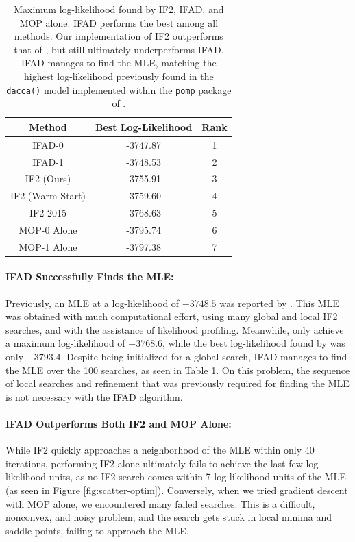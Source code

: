 \documentclass[11pt]{article}
\begin{document}
\begin{table}[h!]
\centering
\begin{tabular}{||c c c||} 
 \hline
 Method & Best Log-Likelihood & Rank \\ [0.5ex] 
 \hline\hline
     IFAD-0 & -3747.87 & 1\\
     IFAD-1 & -3748.53 & 2\\
     IF2 (Ours) & -3755.91 & 3\\
     IF2 (Warm Start) & -3759.60 & 4 \\
     IF2 2015 & -3768.63 & 5\\ 
     MOP-0 Alone & -3795.74 & 6\\
     MOP-1 Alone & -3797.38 & 7\\
 \hline
\end{tabular}
\caption{Maximum log-likelihood found by IF2, IFAD, and MOP alone. IFAD performs the best among all methods. Our implementation of IF2 outperforms that of \cite{ionides15}, but still ultimately underperforms IFAD. IFAD manages to find the MLE, matching the highest log-likelihood previously found in the \texttt{dacca()} model implemented within the \texttt{pomp} package of \cite{king16}.}
\label{table:mle}
\end{table}

\paragraph{IFAD Successfully Finds the MLE:} Previously, an MLE at a log-likelihood of $-3748.5$ was reported by \cite{king16}.
This MLE was obtained with much computational effort, using many global and local IF2 searches, and with the assistance of likelihood profiling.
Meanwhile, \cite{ionides15} only achieve a maximum log-likelihood of $-3768.6$, while the best log-likelihood found by \cite{king08} was only $-3793.4$. Despite being initialized for a global search, IFAD manages to find the MLE over the 100 searches, as seen in Table \ref{table:mle}. On this problem, the sequence of local searches and refinement that was previously required for finding the MLE is not necessary with the IFAD algorithm. 

\paragraph{IFAD Outperforms Both IF2 and MOP Alone:} While IF2 quickly approaches a neighborhood of the MLE within only 40 iterations, performing IF2 alone ultimately fails to achieve the last few log-likelihood units, as no IF2 search comes within 7 log-likelihood units of the MLE (as seen in Figure \ref{fig:scatter-optim}). Conversely, when we tried gradient descent with MOP alone, we encountered many failed searches. This is a difficult, nonconvex, and noisy problem,  and the search gets stuck in local minima and saddle points, failing to approach the MLE. 
\end{document}

